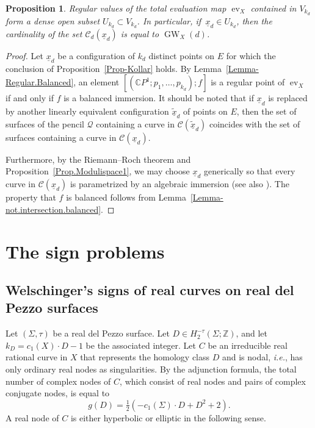\documentclass[11pt]{amsart}
\numberwithin{equation}{section}
\theoremstyle{definition}
\theoremstyle{plain}
\newtheorem{proposition}[definition]{Proposition}
\theoremstyle{remark}
\newcommand{\Z}{\mathbb{Z}}
\newcommand{\C}{\mathbb{C}}
\DeclareMathOperator{\GW}{GW}
\DeclareMathOperator{\ev}{ev}
\begin{document}
     \begin{proposition}\label{Prop.Modulispace2}
Regular values of the total evaluation map $\ev_{X}$ contained in $V_{k_d}$ form a dense open subset $U_{k_d}\subset V_{k_d}$.
In particular, if\, $\underline{x}_d\in U_{k_d}$, then the cardinality of the set $\mathcal{C}_{d}(\underline{x}_d)$ is equal to $\GW_X(d)$.
    \end{proposition}
    
      
    \begin{proof}
    Let $\underline{x}_d$ be a configuration of $k_d$ distinct points on $E$ for which the conclusion of Proposition~\ref{Prop-Kollar} holds. 
    By Lemma~\ref{Lemma-Regular.Balanced}, an element $[(\C P^1;p_1,\ldots,p_{k_d});f]$ is a regular point of $\ev_X$ if and only if $f$ is a balanced immersion. It should be noted that if $\underline{x}_d$  is replaced  by another linearly equivalent configuration  $\tilde{\underline{x}}_d$ of points on $E$, then the set of surfaces of the pencil $\mathcal{Q}$ containing a curve in $\mathcal{C}(\tilde{\underline{x}}_d)$ coincides with the set of surfaces containing a curve in $\mathcal{C}(\underline{x}_d)$.

Furthermore, by the Riemann--Roch theorem and Proposition~\ref{Prop.Modulispace1}, we may choose ${\underline{x}_d}$ generically so that every curve in $\mathcal{C}({\underline{x}_d})$  is parametrized by an algebraic immersion (see also  \cite[Proof of Proposition 5.3]{brugalle2016pencils}). The property that $f$ is balanced follows from Lemma~\ref{Lemma-not.intersection.balanced}.
    \end{proof}
    

 
  \section{The sign problems}\label{Sect-Welschinger}
  
  \subsection{Welschinger's signs of  real curves on real del Pezzo surfaces} \label{subsect-Welschinger.surfaces}

Let $(\Sigma,\tau)$ be a real del Pezzo surface. 
Let $D\in H_2^{-\tau}(\Sigma;\Z)$, and let $k_D=c_1(X)\cdot D-1$ 
be the associated integer. 
Let $C$ be an irreducible real rational curve in $X$ that represents the homology class $D$ and is nodal, \textit{i.e.}, has only ordinary real nodes as singularities.
By the adjunction formula, the total number of complex nodes of $C$, which consist of real nodes and pairs of complex conjugate nodes, is equal to
$$g(D)=\tfrac{1}{2}(-c_1(\Sigma)\cdot D+D^2+2).$$  
 A real node of $C$ is either hyperbolic or elliptic in the following sense.
\end{document}
